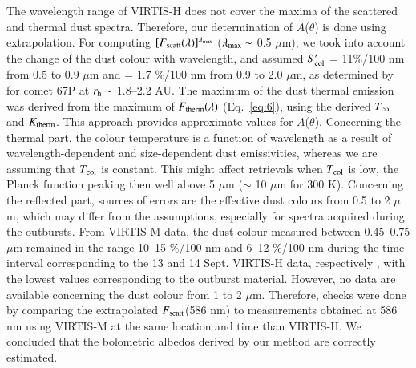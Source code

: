 \documentclass[a4paper,fleqn,usenatbib]{mnras}
\begin{document}


The wavelength range of VIRTIS-H does not cover the maxima of the scattered and thermal dust spectra. Therefore, our determination of $A$($\theta$) is done using extrapolation. For computing $[F_{\rm scatt}(\lambda)]^{\lambda_{\rm max}}$ ($\lambda_{\rm max} \sim $ 0.5 $\mu$m), we took into account the change of the dust colour with wavelength, and assumed $S'_{\rm col}$ = 11\%/100 nm from 0.5 to 0.9 $\mu$m and = 1.7 \%/100 nm from 0.9 to 2.0 $\mu$m, as determined by \citet{Rinaldi2016} for comet 67P at $r_{\rm h} \sim$ 1.8--2.2 AU. The maximum of the dust thermal emission was derived from the maximum of $F_{\rm therm}(\lambda)$ (Eq.~\ref{eq:6}), using the derived $T_{\rm col}$ and $K_{\rm therm}$. This approach provides approximate values for $A$($\theta$). Concerning the thermal part, the colour temperature is a function of wavelength as a result of wavelength-dependent and size-dependent dust emissivities, whereas we are assuming that $T_{\rm col}$ is constant. This might affect retrievals when $T_{\rm col}$ is low, the Planck function peaking then well above 5 $\mu$m ($\sim$ 10 $\mu$m for 300 K). Concerning the reflected part, sources of errors are the effective dust colours from 0.5 to 2 $\mu$m, which may differ from the assumptions, especially for spectra acquired during the outbursts. From VIRTIS-M data, the dust colour measured between 0.45--0.75 $\mu$m remained in the range 10--15 \%/100 nm  and 6--12 \%/100 nm  during the time interval corresponding to the 13 and 14 Sept. VIRTIS-H data, respectively \citep{Rinaldi2017}, with the lowest values corresponding to the outburst material. However, no data are available concerning the dust colour from 1 to 2 $\mu$m. Therefore, checks were done by
comparing the extrapolated $F_{\rm scatt}$(586 nm) to measurements obtained at 586 nm using VIRTIS-M at the same location and time than VIRTIS-H. We concluded that the bolometric albedos derived by our method are correctly estimated.

\end{document}
